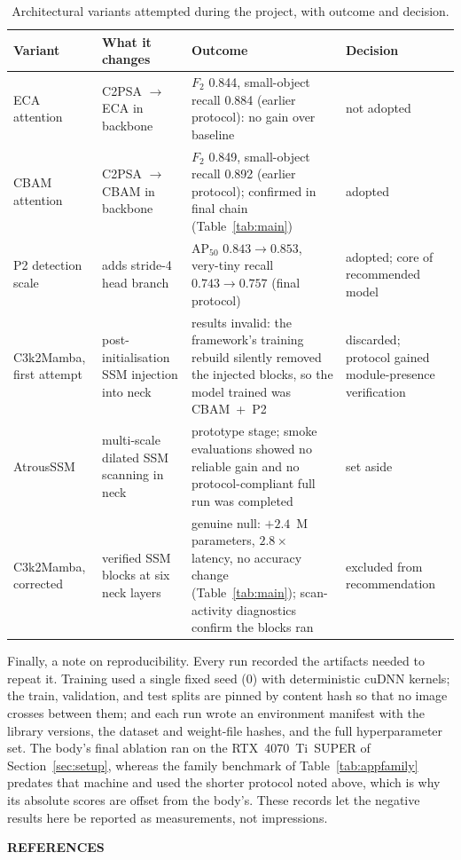 \documentclass[12pt,a4paper,oneside]{report}
\begin{document}
\begin{table}[H]
  \centering
  \caption{Architectural variants attempted during the project, with outcome and decision.}
  \label{tab:apphistory}
  \small
  \setlength{\tabcolsep}{4pt}
  \begin{tabular}{@{}p{2.9cm} p{4.3cm} p{4.4cm} p{2.4cm}@{}}
    \toprule
    Variant & What it changes & Outcome & Decision \\
    \midrule
    ECA attention & C2PSA $\to$ ECA in backbone & $F_2$ 0.844, small-object recall 0.884 (earlier protocol): no gain over baseline & not adopted \\
    CBAM attention & C2PSA $\to$ CBAM in backbone & $F_2$ 0.849, small-object recall 0.892 (earlier protocol); confirmed in final chain (Table~\ref{tab:main}) & adopted \\
    P2 detection scale & adds stride-4 head branch & $\mathrm{AP}_{50}$ $0.843 \to 0.853$, very-tiny recall $0.743 \to 0.757$ (final protocol) & adopted; core of recommended model \\
    C3k2Mamba, first attempt & post-initialisation SSM injection into neck & results invalid: the framework's training rebuild silently removed the injected blocks, so the model trained was CBAM~+~P2 & discarded; protocol gained module-presence verification \\
    AtrousSSM & multi-scale dilated SSM scanning in neck & prototype stage; smoke evaluations showed no reliable gain and no protocol-compliant full run was completed & set aside \\
    C3k2Mamba, corrected & verified SSM blocks at six neck layers & genuine null: $+2.4$~M parameters, $2.8\times$ latency, no accuracy change (Table~\ref{tab:main}); scan-activity diagnostics confirm the blocks ran & excluded from recommendation \\
    \bottomrule
  \end{tabular}
\end{table}

Finally, a note on reproducibility. Every run recorded the artifacts needed to
repeat it. Training used a single fixed seed (0) with deterministic cuDNN
kernels; the train, validation, and test splits are pinned by content hash so
that no image crosses between them; and each run wrote an environment manifest
with the library versions, the dataset and weight-file hashes, and the full
hyperparameter set. The body's final ablation ran on the RTX~4070~Ti~SUPER of
Section~\ref{sec:setup}, whereas the family benchmark of
Table~\ref{tab:appfamily} predates that machine and used the shorter protocol
noted above, which is why its absolute scores are offset from the body's. These
records let the negative results here be reported as measurements, not
impressions.

\clearpage
{}
{}
\begin{center}{\fontsize{14}{21}\selectfont\bfseries REFERENCES}\end{center}
\printbibliography[heading=none]
\end{document}

